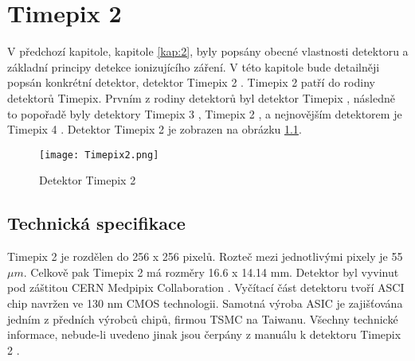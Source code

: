 \chapter{Timepix 2}
\label{kap:3}
V předchozí kapitole, kapitole \ref{kap:2}, byly popsány obecné vlastnosti detektoru a základní principy detekce ionizujícího záření. V této kapitole bude detailněji popsán konkrétní detektor, detektor Timepix 2 \cite{tpx2_manual}. Timepix 2 patří do rodiny detektorů Timepix. Prvním z rodiny detektorů byl detektor Timepix \cite{Llopart}, následně to popořadě byly detektory Timepix 3 \cite{Timepix3}, Timepix 2 \cite{tpx2_manual}, \cite{Timepix2} a nejnovějším detektorem je Timepix 4 \cite{Timepix4}. Detektor Timepix 2 je zobrazen na obrázku \ref{fig:Timepix2}.
\begin{figure}[h!]
	\centering
	\captionsetup{justification=centering}
	\texttt{[image: Timepix2.png]}
	\caption{Detektor Timepix 2 \cite{Timepix2}} 
	\label{fig:Timepix2}
\end{figure}	


\section{Technická specifikace} %
Timepix 2 je rozdělen do 256 x 256 pixelů. Rozteč mezi jednotlivými pixely je 55 $\mu$$m$. Celkově pak Timepix 2 má rozměry 16.6 x 14.14 mm. Detektor byl vyvinut pod záštitou CERN Medpipix Collaboration \cite{Medpix}. Vyčítací část detektoru tvoří ASCI chip navržen ve 130 nm CMOS technologii. Samotná výroba ASIC je zajišťována jedním z předních výrobců chipů, firmou TSMC \cite{TSMC} na Taiwanu. Všechny technické informace, nebude-li uvedeno jinak jsou čerpány z manuálu k detektoru Timepix 2 \cite{tpx2_manual}.

